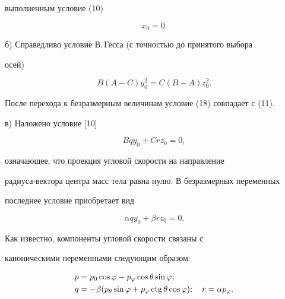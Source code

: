 выполненным условие (10)


$$


x_0=0.


$$





б) Справедливо условие В.\,Гесса (с точностью до принятого выбора


осей)


\begin{equation}


B(A-C)y^2_0=C(B-A)z^2_0.


\end{equation}


После перехода к безразмерным величинам условие (18) совпадает с (11).





в) Наложено условие [10]


$$


Bqy_0+Crz_0=0,


$$


означающее, что проекция угловой скорости на направление


радиуса-вектора центра масс тела равна нулю. В безразмерных переменных


последнее условие приобретает вид


\begin{equation}


\alpha qy_0+\beta rz_0=0.


\end{equation}





Как известно, компоненты угловой скорости связаны с


каноническими переменными следующим образом:


\begin{equation}


\begin{split}


p&=p_0\cos\varphi-p_\varphi\cos\theta\sin\varphi;\\


q&=-\beta(p_\theta\sin\varphi+p_\varphi\ctg\theta\cos\varphi);


\quad r=\alpha p_\varphi.


\end{split}


\end{equation}


